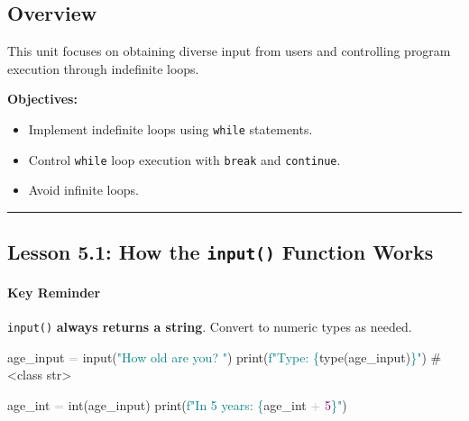 \documentclass[
  justified,
  openright,
]{tufte-book}
\let\subsubsection\paragraph
\let\paragraph\paragraph
\newcommand{\BuiltInTok}[1]{#1}
\newcommand{\CommentTok}[1]{\textcolor{MidGray}{#1}}
\newcommand{\DecValTok}[1]{\textcolor{Purple}{#1}}
\newcommand{\NormalTok}[1]{#1}
\newcommand{\OperatorTok}[1]{\textcolor{DarkGray}{#1}}
\newcommand{\SpecialCharTok}[1]{\textcolor{Teal}{#1}}
\newcommand{\SpecialStringTok}[1]{\textcolor{Teal}{#1}}
\newcommand{\StringTok}[1]{\textcolor{Teal}{#1}}
\newenvironment{Shaded}{%
  \begin{snugshade}
}{%
  \end{snugshade}
}
\let\subsubsection\paragraph
\let\paragraph\paragraph
\providecommand{\tightlist}{%
  \setlength{\itemsep}{0pt}\setlength{\parskip}{0pt}}
\begin{document}
\subsection{Overview}\label{overview-5}

This unit focuses on obtaining diverse input from users and controlling
program execution through indefinite loops.

\textbf{Objectives:}

\begin{itemize}
\tightlist
\item
  Implement indefinite loops using \texttt{while} statements.
\item
  Control \texttt{while} loop execution with \texttt{break} and
  \texttt{continue}.
\item
  Avoid infinite loops.
\end{itemize}

\begin{center}\rule{0.5\linewidth}{0.5pt}\end{center}

\subsection{\texorpdfstring{Lesson 5.1: How the \texttt{input()}
Function
Works}{Lesson 5.1: How the input() Function Works}}\label{lesson-5.1-how-the-input-function-works}

\subsubsection{Key Reminder}\label{key-reminder}

\texttt{input()} \textbf{always returns a string}. Convert to numeric
types as needed.

\begin{Shaded}
\begin{Highlighting}[]
\NormalTok{age\_input }\OperatorTok{=} \BuiltInTok{input}\NormalTok{(}\StringTok{"How old are you? "}\NormalTok{)}
\BuiltInTok{print}\NormalTok{(}\SpecialStringTok{f"Type: }\SpecialCharTok{\{}\BuiltInTok{type}\NormalTok{(age\_input)}\SpecialCharTok{\}}\SpecialStringTok{"}\NormalTok{)    }\CommentTok{\# \textless{}class \textquotesingle{}str\textquotesingle{}\textgreater{}}

\NormalTok{age\_int }\OperatorTok{=} \BuiltInTok{int}\NormalTok{(age\_input)}
\BuiltInTok{print}\NormalTok{(}\SpecialStringTok{f"In 5 years: }\SpecialCharTok{\{}\NormalTok{age\_int }\OperatorTok{+} \DecValTok{5}\SpecialCharTok{\}}\SpecialStringTok{"}\NormalTok{)}
\end{Highlighting}
\end{Shaded}
\end{document}
